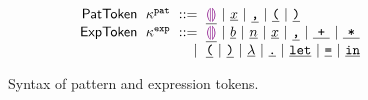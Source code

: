 \begin{figure}
  \vspace{-3px}
  \[
  \arraycolsep=3pt\begin{array}{rlrl}
      \mathsf{PatToken} & \token^{\pat} & ::= &
        \tokenLit{\shole} ~\vert~
        \tokenLit{\svar{x}} ~\vert~
        \tokenLit{\sprod{}{}} ~\vert~
        \tokenLit{\texttt{(}} ~\vert~
        \tokenLit{\texttt{)}} \\
      \mathsf{ExpToken} & \token^{\expr} & ::= &
        \tokenLit{\shole} ~\vert~
        \tokenLit{\sboollit{b}} ~\vert~
        \tokenLit{\snumlit{n}} ~\vert~
        \tokenLit{\svar{x}} ~\vert~
        \tokenLit{\sprod{}{}} ~\vert~
        \tokenLit{\splus{}{}} ~\vert~
        \tokenLit{\smult{}{}} \\
      & & \vert &
        \tokenLit{\texttt{(}} ~\vert~
        \tokenLit{\texttt{)}} ~\vert~
        \tokenLit{\lambda} ~\vert~
        \tokenLit{\texttt{.}} ~\vert~
        \tokenLit{\texttt{let}} ~\vert~
        \tokenLit{\texttt{=}} ~\vert~
        \tokenLit{\texttt{in}}
  \end{array}\]
  \caption{
    Syntax of pattern and expression tokens.
  }
  \label{fig:token-syntax}
\end{figure}